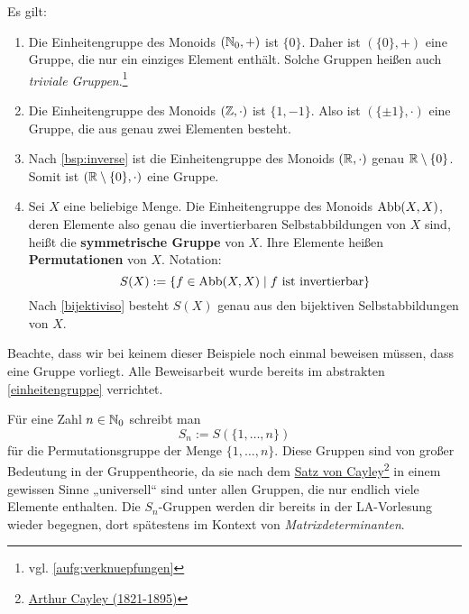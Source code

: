 \begin{bsp}  
    Es gilt:
    \begin{enumerate}
        \item Die Einheitengruppe des Monoids $(\mathbb N_0,+)$ ist $\{0\}$. Daher ist $(\{0\},+)$ eine Gruppe, die nur ein einziges Element enthält. Solche Gruppen heißen auch \emph{triviale Gruppen}.\footnote{vgl. \cref{aufg:verknuepfungen}}
        \item Die Einheitengruppe des Monoids $(\mathbb Z,\cdot)$ ist $\{1,-1\}$. Also ist $(\{\pm 1\},\cdot)$ eine Gruppe, die aus genau zwei Elementen besteht.
        \item Nach \cref{bsp:inverse} ist die Einheitengruppe des Monoids $(\mathbb R,\cdot)$ genau $\mathbb R\setminus \{0\}$. Somit ist $(\mathbb R\setminus \{0\},\cdot)$ eine Gruppe.
        \item Sei $X$ eine beliebige Menge. Die Einheitengruppe des Monoids $\operatorname{Abb}(X,X)$, deren Elemente also genau die invertierbaren Selbstabbildungen von $X$ sind, heißt die \textbf{symmetrische Gruppe} von $X$. Ihre Elemente heißen \textbf{Permutationen} von $X$. Notation:
            \[ S(X) := \{f\in \Abb(X,X)\mid f\ \text{ist invertierbar} \} \]
        Nach \cref{bijektiviso} besteht $S(X)$ genau aus den bijektiven Selbstabbildungen von $X$.
    \end{enumerate}
    Beachte, dass wir bei keinem dieser Beispiele noch einmal beweisen müssen, dass eine Gruppe vorliegt. Alle Beweisarbeit wurde bereits im abstrakten \cref{einheitengruppe} verrichtet.
\end{bsp}


\begin{bem}
    Für eine Zahl $n\in \mathbb N_0$ schreibt man
        \[ S_n := S(\{1,\dots , n\}) \]
    für die Permutationsgruppe der Menge $\{1,\dots , n\}$. Diese Gruppen sind von großer Bedeutung in der Gruppentheorie, da sie nach dem \href{https://de.wikipedia.org/wiki/Satz_von_Cayley}{Satz von Cayley}\footnote{\href{https://de.wikipedia.org/wiki/Arthur_Cayley}{Arthur Cayley (1821-1895)}} in einem gewissen Sinne „universell“ sind unter allen Gruppen, die nur endlich viele Elemente enthalten. Die $S_n$-Gruppen werden dir bereits in der LA-Vorlesung wieder begegnen, dort spätestens im Kontext von \emph{Matrixdeterminanten}.
\end{bem}



